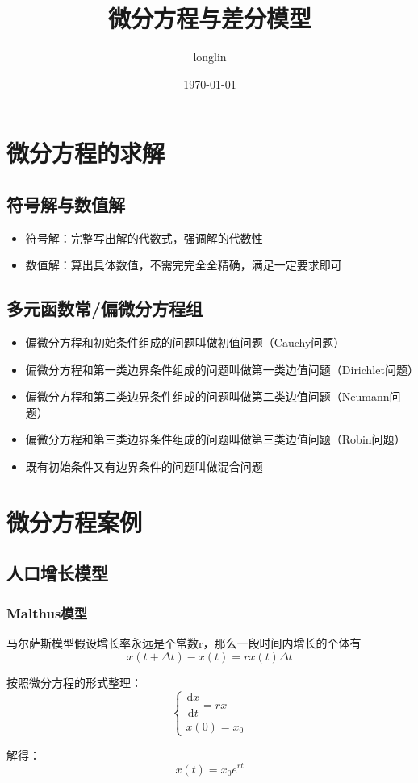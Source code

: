 \documentclass[12pt,a4paper]{article}
\title{微分方程与差分模型}
\author{longlin}
\date{\today}
\begin{document}
\maketitle

\section{微分方程的求解}
\subsection{符号解与数值解}
\begin{itemize}
    \item 符号解：完整写出解的代数式，强调解的代数性
    \item 数值解：算出具体数值，不需完完全全精确，满足一定要求即可
\end{itemize}

\subsection{多元函数常/偏微分方程组}
\begin{itemize}
    \item 偏微分方程和初始条件组成的问题叫做初值问题（Cauchy问题）
    \item 偏微分方程和第一类边界条件组成的问题叫做第一类边值问题（Dirichlet问题）
    \item 偏微分方程和第二类边界条件组成的问题叫做第二类边值问题（Neumann问题）
    \item 偏微分方程和第三类边界条件组成的问题叫做第三类边值问题（Robin问题）
    \item 既有初始条件又有边界条件的问题叫做混合问题
\end{itemize}

\section{微分方程案例}
\subsection{人口增长模型}
\subsubsection{Malthus模型}
马尔萨斯模型假设增长率永远是个常数r，那么一段时间内增长的个体有
$$
x(t + \Delta t) - x(t) = rx(t)\Delta t
$$

按照微分方程的形式整理：
$$
\begin{cases}
    \dfrac{\textrm{d} x}{\textrm{d} t} = rx \\
    x(0) = x_0
\end{cases}
$$

解得：
$$
x(t) = x_0 e^{rt}
$$
\end{document}
